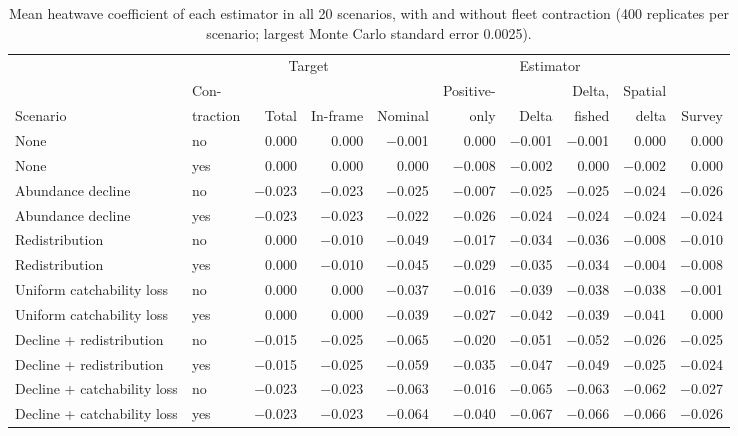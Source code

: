 \documentclass[11pt,a4paper]{article}
\begin{document}
\begin{table}[htbp]
\centering\scriptsize
\setlength{\tabcolsep}{2.5pt}
\caption{Mean heatwave coefficient of each estimator in all 20 scenarios, with and without fleet contraction (400 replicates per scenario; largest Monte Carlo standard error 0.0025).}
\label{tab:coeffull}
\begin{tabular}{@{}>{\raggedright\arraybackslash}p{2.9cm}lrrrrrrrr@{}}
\toprule
 & & \multicolumn{2}{c}{Target} & \multicolumn{6}{c}{Estimator} \\
\cmidrule(lr){3-4}\cmidrule(l){5-10}
 & Con- & & & & Positive- & & Delta, & Spatial & \\
Scenario & traction & Total & In-frame & Nominal & only & Delta & fished & delta & Survey \\
\midrule
None & no & 0.000 & 0.000 & $-$0.001 & 0.000 & $-$0.001 & $-$0.001 & 0.000 & 0.000 \\
None & yes & 0.000 & 0.000 & 0.000 & $-$0.008 & $-$0.002 & 0.000 & $-$0.002 & 0.000 \\
Abundance decline & no & $-$0.023 & $-$0.023 & $-$0.025 & $-$0.007 & $-$0.025 & $-$0.025 & $-$0.024 & $-$0.026 \\
Abundance decline & yes & $-$0.023 & $-$0.023 & $-$0.022 & $-$0.026 & $-$0.024 & $-$0.024 & $-$0.024 & $-$0.024 \\
Redistribution & no & 0.000 & $-$0.010 & $-$0.049 & $-$0.017 & $-$0.034 & $-$0.036 & $-$0.008 & $-$0.010 \\
Redistribution & yes & 0.000 & $-$0.010 & $-$0.045 & $-$0.029 & $-$0.035 & $-$0.034 & $-$0.004 & $-$0.008 \\
Uniform catchability loss & no & 0.000 & 0.000 & $-$0.037 & $-$0.016 & $-$0.039 & $-$0.038 & $-$0.038 & $-$0.001 \\
Uniform catchability loss & yes & 0.000 & 0.000 & $-$0.039 & $-$0.027 & $-$0.042 & $-$0.039 & $-$0.041 & 0.000 \\
Decline + redistribution & no & $-$0.015 & $-$0.025 & $-$0.065 & $-$0.020 & $-$0.051 & $-$0.052 & $-$0.026 & $-$0.025 \\
Decline + redistribution & yes & $-$0.015 & $-$0.025 & $-$0.059 & $-$0.035 & $-$0.047 & $-$0.049 & $-$0.025 & $-$0.024 \\
Decline + catchability loss & no & $-$0.023 & $-$0.023 & $-$0.063 & $-$0.016 & $-$0.065 & $-$0.063 & $-$0.062 & $-$0.027 \\
Decline + catchability loss & yes & $-$0.023 & $-$0.023 & $-$0.064 & $-$0.040 & $-$0.067 & $-$0.066 & $-$0.066 & $-$0.026 \\

\end{tabular}
\end{table}
\end{document}
